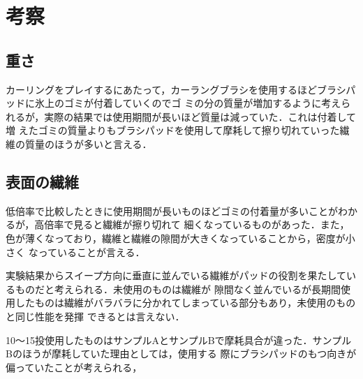 \documentclass[main]{subfiles}
\begin{document}
\chapter{考察}
\section{重さ}
カーリングをプレイするにあたって，カーラングブラシを使用するほどブラシパッドに氷上のゴミが付着していくのでゴ
ミの分の質量が増加するように考えられるが，実際の結果では使用期間が長いほど質量は減っていた．これは付着して増
えたゴミの質量よりもブラシパッドを使用して摩耗して擦り切れていった繊維の質量のほうが多いと言える．
\\

\section{表面の繊維}
低倍率で比較したときに使用期間が長いものほどゴミの付着量が多いことがわかるが，高倍率で見ると繊維が擦り切れて
細くなっているものがあった．また，色が薄くなっており，繊維と繊維の隙間が大きくなっていることから，密度が小さく
なっていることが言える．

実験結果からスイープ方向に垂直に並んでいる繊維がパッドの役割を果たしているものだと考えられる．未使用のものは繊維が
隙間なく並んでいるが長期間使用したものは繊維がバラバラに分かれてしまっている部分もあり，未使用のものと同じ性能を発揮
できるとは言えない．

10～15投使用したものはサンプルAとサンプルBで摩耗具合が違った．サンプルBのほうが摩耗していた理由としては，使用する
際にブラシパッドのもつ向きが偏っていたことが考えられる，
\end{document}
